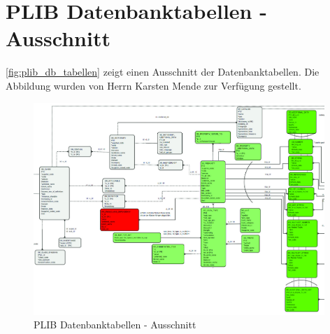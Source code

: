 \chapter{PLIB Datenbanktabellen - Ausschnitt}\label{kap:anh_plib_db}

\autoref{fig:plib_db_tabellen} zeigt einen Ausschnitt der Datenbanktabellen. Die Abbildung wurden von Herrn Karsten Mende zur Verfügung gestellt. 

\begin{figure}[htbp]
	\centering
		\includegraphics[width=0.98\textwidth]{images/plib_datenbankausschnitt.jpg}
	\caption{PLIB Datenbanktabellen - Ausschnitt}
	\label{fig:plib_db_tabellen}
\end{figure}
